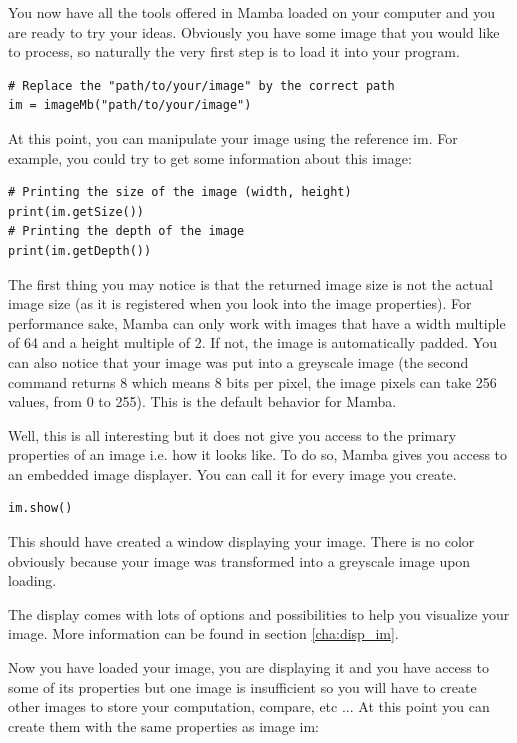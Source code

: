 \documentclass[a4paper,10pt,oneside]{article}
\begin{document}
You now have all the tools offered in Mamba loaded on your computer and you are
ready to try your ideas. Obviously you have some image that you would like to
process, so naturally the very first step is to load it into your program.

\lstset{language=Python}
\begin{lstlisting}
# Replace the "path/to/your/image" by the correct path
im = imageMb("path/to/your/image")
\end{lstlisting}

At this point, you can manipulate your image using the reference im. For example,
you could try to get some information about this image:

\lstset{language=Python}
\begin{lstlisting}
# Printing the size of the image (width, height)
print(im.getSize())
# Printing the depth of the image 
print(im.getDepth())
\end{lstlisting}

The first thing you may notice is that the returned image size is not the actual
image size (as it is registered when you look into the image properties). For
performance sake, Mamba can only work with images that have a width multiple of 64
and a height multiple of 2. If not, the image is automatically padded. You can 
also notice that your image was put into a greyscale image (the second command 
returns 8 which means 8 bits per pixel, the image pixels can take 256 values, from 
0 to 255). This is the default behavior for Mamba.

Well, this is all interesting but it does not give you access to the primary
properties of an image i.e. how it looks like. To do so, Mamba gives you access to
an embedded image displayer. You can call it for every image you create.

\lstset{language=Python}
\begin{lstlisting}
im.show()
\end{lstlisting}

This should have created a window displaying your image. There is no color
obviously because your image was transformed into a greyscale image upon loading.

The display comes with lots of options and possibilities to help you visualize
your image. More information can be found in section \ref{cha:disp_im}.

Now you have loaded your image, you are displaying it and you have access to 
some of its properties but one image is insufficient so you will have to create
other images to store your computation, compare, etc ... At this point you can
create them with the same properties as image im:
\end{document}

